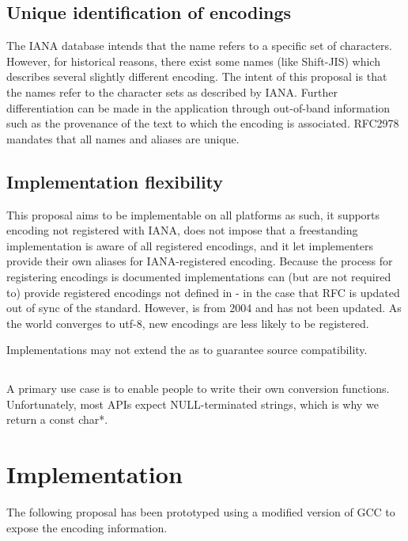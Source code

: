 \documentclass{wg21}
\begin{document}
\subsection{Unique identification of encodings}

The IANA database intends that the name refers to a specific set of characters.
However, for historical reasons, there exist some names (like Shift-JIS) which describes several slightly different encoding.
The intent of this proposal is that the names refer to the character sets as described by IANA.
Further differentiation can be made in the application through out-of-band information such as the provenance of the text to which the encoding is associated. RFC2978 mandates that all names and aliases are unique.

\subsection{Implementation flexibility}

This proposal aims to be implementable on all platforms as such, it supports encoding not registered with IANA, does not impose that
a freestanding implementation is aware of all registered encodings, and it let implementers provide their own aliases for IANA-registered encoding.
Because the process for registering encodings is documented \cite{rfc2978} implementations can (but are not required to) provide
registered encodings not defined in \cite{rfc3808} - in the case that RFC is updated out of sync of the standard.
However, \cite{rfc3808} is from 2004 and has not been updated. As the world converges to utf-8, new encodings are less likely to
be registered.

Implementations may not extend the  as to guarantee source compatibility.

\subsection{}

A primary use case is to enable people to write their own conversion functions.
Unfortunately, most APIs expect NULL-terminated strings, which is why we return a const char*.

\section{Implementation}

The following proposal has been prototyped using a modified version of GCC to expose the encoding information.
\end{document}
